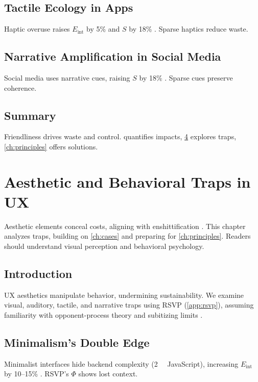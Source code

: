\documentclass[openany]{book}
\newcommand{\PhiS}{\Phi} %
\newcommand{\Sent}{S} %
\newcommand{\Eint}{E_{\mathrm{int}}} %
\begin{document}
\section{Tactile Ecology in Apps}
\label{sec:cases-tactile}
Haptic overuse raises \(\Eint\) by 5\% and \(\Sent\) by 18\% \citep{gallace2006}. Sparse haptics reduce waste.

\section{Narrative Amplification in Social Media}
\label{sec:cases-narrative}
Social media uses narrative cues, raising \(\Sent\) by 18\% \citep{lewis1942}. Sparse cues preserve coherence.

\section{Summary}
Friendliness drives waste and control.  quantifies impacts, \cref{ch:aesthetic} explores traps, \cref{ch:principles} offers solutions.

\chapter{Aesthetic and Behavioral Traps in UX}
\label{ch:aesthetic}

Aesthetic elements conceal costs, aligning with enshittification \citep{doctorow2022}. This chapter analyzes traps, building on \cref{ch:cases} and preparing for \cref{ch:principles}. Readers should understand visual perception and behavioral psychology.

\section{Introduction}
\label{sec:aesthetic-intro}
UX aesthetics manipulate behavior, undermining sustainability. We examine visual, auditory, tactile, and narrative traps using RSVP (\cref{app:rsvp}), assuming familiarity with opponent-process theory \citep{hurvich1981} and subitizing limits \citep{kaufman1949}.

\section{Minimalism’s Double Edge}
\label{sec:aesthetic-minimalism}
Minimalist interfaces hide backend complexity (\SI{2}{\mega\byte} JavaScript), increasing \(\Eint\) by 10--15\% \citep{designlab2024,extentia2024}. RSVP’s \(\PhiS\) shows lost context.
\end{document}
